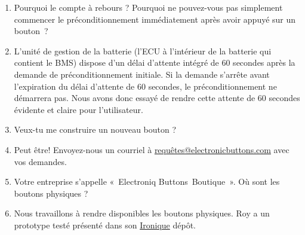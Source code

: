 \documentclass[superscriptaddress,onecolumn,floatfix]{revtex4-2}
\begin{document}
\begin{enumerate}
  \item[Question :] Pourquoi le compte à rebours ? Pourquoi ne pouvez-vous pas simplement commencer le préconditionnement immédiatement après avoir appuyé sur un bouton ?
  \item[UN:] L'unité de gestion de la batterie (l'ECU à l'intérieur de la batterie qui contient le BMS) dispose d'un délai d'attente intégré de 60 secondes après la demande de préconditionnement initiale. Si la demande s'arrête avant l'expiration du délai d'attente de 60 secondes, le préconditionnement ne démarrera pas. Nous avons donc essayé de rendre cette attente de 60 secondes évidente et claire pour l'utilisateur.
  \item[Question :] Veux-tu me construire un nouveau bouton ?
  \item[UN:] Peut être! Envoyez-nous un courriel à \href{mailto:requests@electroniqbuttons.com}{requêtes@electronicbuttons.com} avec vos demandes.
  \item[Question :] Votre entreprise s'appelle « Electroniq Buttons Boutique ». Où sont les boutons physiques ?
  \item[UN:] Nous travaillons à rendre disponibles les boutons physiques. Roy a un prototype testé présenté dans son \href{https://github.com/dragz/ironiq}{Ironique} dépôt.
\end{enumerate}
\appendix 

{}
\end{document}
